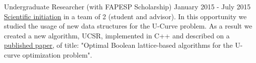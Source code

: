 \documentclass[11pt, a4paper]{awesome-cv-res}
\begin{document}
\begin{cventries}
\cventry
{Undergraduate Researcher (with FAPESP Scholarship)}
{}
{}
{January 2015 - July 2015}
{\href{https://bv.fapesp.br/en/bolsas/156441/studies-of-efficient-data-structures-to-tackle-the-u-curve-optimization-problem/}
{\color{awesome} \underline{Scientific initiation}} in a team of 2 
    (student and advisor). In this opportunity we studied the usage of 
    new  data structures for the U-Curve problem. As a result we created
    a  new algorithm, UCSR, implemented in C++ and described on a 
    \href{https://www.sciencedirect.com/science/article/pii/S0020025518306789?via\%3Dihub}
    {\color{awesome}\underline{published paper}}, of title: "Optimal
    Boolean lattice-based algorithms for the U-curve optimization 
    problem".
}



\end{cventries}
\end{document}
